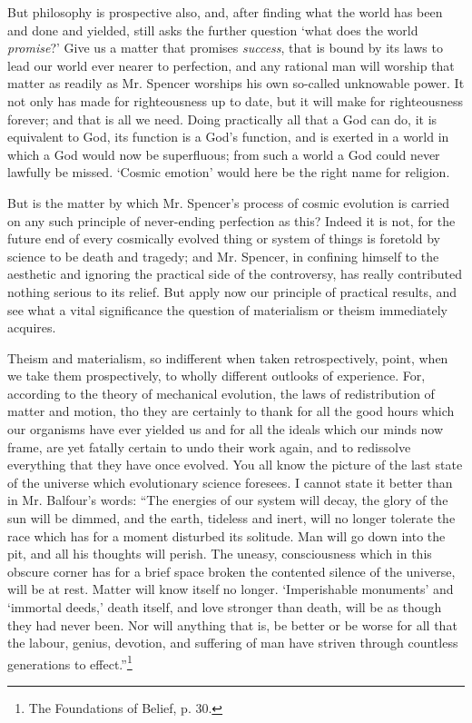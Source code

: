 \documentclass[]{article}
\begin{document}
But philosophy is prospective also, and, after finding what the world has been and done and yielded, still asks the further question `what does the world \emph{promise}?' Give us a matter that promises \emph{success}, that is bound by its laws to lead our world ever nearer to perfection, and any rational man will worship that matter as readily as Mr. Spencer worships his own so-called unknowable power. It not only has made for righteousness up to date, but it will make for righteousness forever; and that is all we need. Doing practically all that a God can do, it is equivalent to God, its function is a God's function, and is exerted in a world in which a God would now be superfluous; from such a world a God could never lawfully be missed. `Cosmic emotion' would here be the right name for religion.

But is the matter by which Mr. Spencer's process of cosmic evolution is carried on any such principle of never-ending perfection as this? Indeed it is not, for the future end of every cosmically evolved thing or system of things is foretold by science to be death and tragedy; and Mr. Spencer, in confining himself to the aesthetic and ignoring the practical side of the controversy, has really contributed nothing serious to its relief. But apply now our principle of practical results, and see what a vital significance the question of materialism or theism immediately acquires.

Theism and materialism, so indifferent when taken retrospectively, point, when we take them prospectively, to wholly different outlooks of experience. For, according to the theory of mechanical evolution, the laws of redistribution of matter and motion, tho they are certainly to thank for all the good hours which our organisms have ever yielded us and for all the ideals which our minds now frame, are yet fatally certain to undo their work again, and to redissolve everything that they have once evolved. You all know the picture of the last state of the universe which evolutionary science foresees. I cannot state it better than in Mr. Balfour's words: ``The energies of our system will decay, the glory of the sun will be dimmed, and the earth, tideless and inert, will no longer tolerate the race which has for a moment disturbed its solitude. Man will go down into the pit, and all his thoughts will perish. The uneasy, consciousness which in this obscure corner has for a brief space broken the contented silence of the universe, will be at rest. Matter will know itself no longer. `Imperishable monuments' and `immortal deeds,' death itself, and love stronger than death, will be as though they had never been. Nor will anything that is, be better or be worse for all that the labour, genius, devotion, and suffering of man have striven through countless generations to effect.''\footnote{The Foundations of Belief, p. 30.}
\end{document}
